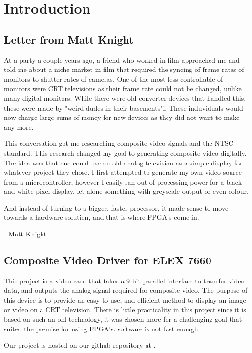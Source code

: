 \section{Introduction}

\subsection{Letter from Matt Knight}

At a party a couple years ago, a friend who worked in film approached me and
told me about a niche market in film that required the syncing of frame rates of
monitors to shutter rates of cameras. One of the most less controllable of
monitors were CRT televisions as their frame rate could not be changed, unlike
many digital monitors. While there were old converter devices that handled this,
these were made by "weird dudes in their basements"i. These induviduals would
now charge large sums of money for new devices as they did not want to make any
more.

This conversation got me researching composite video signals and the NTSC
standard. This research changed my goal to generating composite video digitally.
The idea was that one could use an old analog television as a simple display for
whatever project they chose. I first attempted to generate my own video source
from a microcontroller, however I easily ran out of processing power for a black
and white pixel display, let alone something with greyscale output or even
colour.

And instead of turning to a bigger, faster processor, it made sense to move
towards a hardware solution, and that is where FPGA's come in.

- Matt Knight

\subsection{Composite Video Driver for ELEX 7660}

This project is a video card that takes a 9-bit parallel interface to transfer
video data, and outputs the analog signal required for composite video. The
purpose of this device is to provide an easy to use, and efficient method to
display an image or video on a CRT television. There is little practicality in
this project since it is based on such an old technology, it was chosen more for
a challenging goal that suited the premise for using FPGA's: software is not
fast enough.

Our project is hosted on our github repository at \cite{git}.
